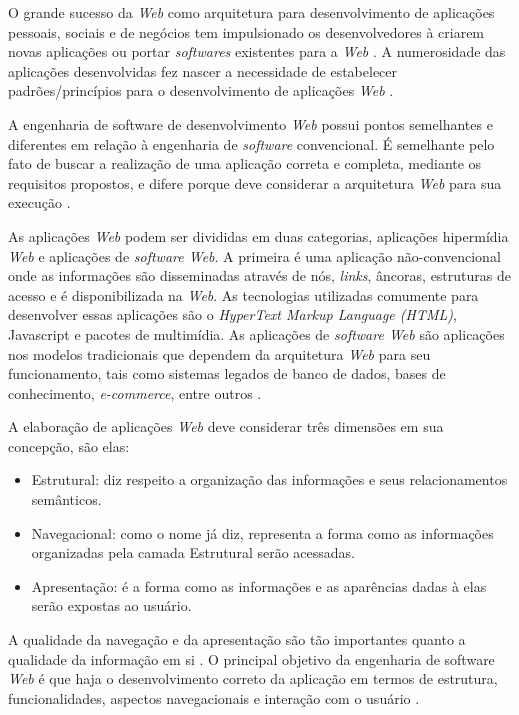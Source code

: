 O grande sucesso da \textit{Web} como arquitetura para desenvolvimento de aplicações pessoais, sociais e de negócios tem impulsionado os desenvolvedores à criarem novas aplicações ou portar \textit{softwares} existentes para a \textit{Web} \cite{fraternali1998conceptual}. A numerosidade das aplicações desenvolvidas fez nascer a necessidade de estabelecer padrões/princípios para o desenvolvimento de aplicações \textit{Web} \cite{pressman2000tangled}.
   
A engenharia de software de desenvolvimento \textit{Web} possui pontos semelhantes e diferentes em relação à engenharia de \textit{software} convencional. É semelhante pelo fato de buscar a realização de uma aplicação correta e completa, mediante os requisitos propostos, e difere porque deve considerar a arquitetura \textit{Web} para sua execução \cite{conte2005processos}.

As aplicações \textit{Web} podem ser divididas em duas categorias, aplicações hipermídia \textit{Web} e aplicações de \textit{software Web}. A primeira é uma aplicação não-convencional onde as informações são disseminadas através de nós, \textit{links}, âncoras, estruturas de acesso e é disponibilizada na \textit{Web}. As tecnologias utilizadas comumente para desenvolver essas aplicações são o \textit{HyperText Markup Language (HTML)}, Javascript e pacotes de multimídia. As aplicações de \textit{software Web} são aplicações nos modelos tradicionais que dependem da arquitetura \textit{Web} para seu funcionamento, tais como sistemas legados de banco de dados, bases de conhecimento, \textit{e-commerce}, entre outros \cite{mendes2005investigating}.

A elaboração de aplicações \textit{Web} deve considerar três dimensões em sua concepção, são elas:

\begin{itemize}
	\item Estrutural: diz respeito a organização das informações e seus relacionamentos semânticos.
	\item Navegacional: como o nome já diz, representa a forma como as informações organizadas pela camada Estrutural serão acessadas.
	\item Apresentação: é a forma como as informações e as aparências dadas à elas serão expostas ao usuário.
\end{itemize}

A qualidade da navegação e da apresentação são tão importantes quanto a qualidade da informação em si \cite{fraternali1998conceptual}. O principal objetivo da engenharia de software \textit{Web} é que haja o desenvolvimento correto da aplicação em termos de estrutura, funcionalidades, aspectos navegacionais e interação com o usuário \cite{pastor2004fitting}.

